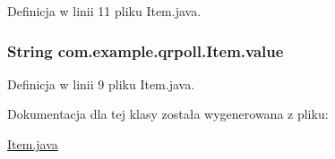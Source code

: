 Definicja w linii 11 pliku Item.\+java.

\hypertarget{classcom_1_1example_1_1qrpoll_1_1_item_abc0a6b74f1923ca042b9b9d3b48f014c}{
\subsubsection[{value}]{\setlength{\rightskip}{0pt plus 5cm}String com.\+example.\+qrpoll.\+Item.\+value\hspace{0.3cm}{\ttfamily [private]}}}\label{classcom_1_1example_1_1qrpoll_1_1_item_abc0a6b74f1923ca042b9b9d3b48f014c}


Definicja w linii 9 pliku Item.\+java.



Dokumentacja dla tej klasy została wygenerowana z pliku\+:\begin{DoxyCompactItemize}
\item 
\hyperlink{_item_8java}{Item.\+java}\end{DoxyCompactItemize}
